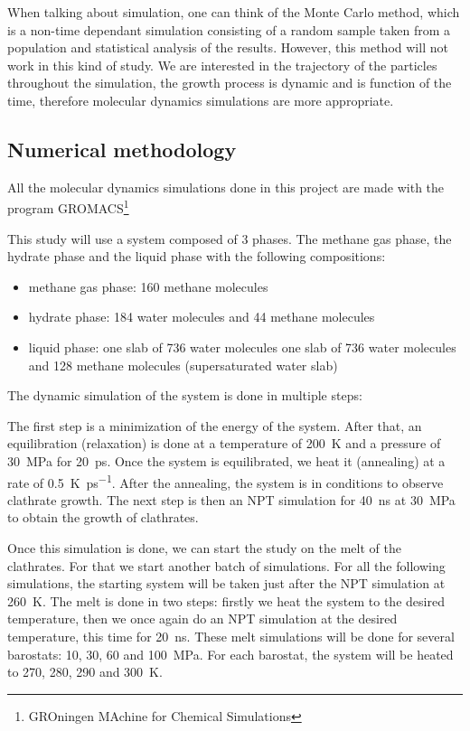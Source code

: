 When talking about simulation, one can think of the Monte Carlo method, which is a non-time dependant simulation consisting of a random sample taken from a population and statistical analysis of the results. However, this method will not work in this kind of study. We are interested in the trajectory of the particles throughout the simulation, the growth process is dynamic and is function of the time, therefore molecular dynamics simulations are more appropriate.

\subsection{Numerical methodology}
All the molecular dynamics simulations done in this project are made with the program GROMACS\footnote{GROningen MAchine for Chemical Simulations}

This study will use a system composed of 3 phases. The methane gas phase, the hydrate phase and the liquid phase with the following compositions:

\begin{itemize}
    \item methane gas phase: 160 methane molecules
    \item hydrate phase: 184 water molecules and 44 methane molecules
    \item liquid phase:
        \subitem one slab of 736 water molecules
        \subitem one slab of 736 water molecules and 128 methane molecules (supersaturated water slab)
\end{itemize}

The dynamic simulation of the system is done in multiple steps:

The first step is a minimization of the energy of the system. After that, an equilibration (relaxation) is done at a temperature of \SI{200}{\kelvin} and a pressure of \SI{30}{\mega\pascal} for \SI{20}{\pico\second}. Once the system is equilibrated, we heat it (annealing) at a rate of \SI{0.5}{\kelvin\per\pico\second}. After the annealing, the system is in conditions to observe clathrate growth. The next step is then an NPT simulation for \SI{40}{\nano\second} at \SI{30}{\mega\pascal} to obtain the growth of clathrates.

Once this simulation is done, we can start the study on the melt of the clathrates. For that we start another batch of simulations. For all the following simulations, the starting system will be taken just after the NPT simulation at \SI{260}{\kelvin}. The melt is done in two steps: firstly we heat the system to the desired temperature, then we once again do an NPT simulation at the desired temperature, this time for \SI{20}{\nano\second}. These melt simulations will be done for several barostats: 10, 30, 60 and \SI{100}{\mega\pascal}. For each barostat, the system will be heated to 270, 280, 290 and \SI{300}{\kelvin}.

